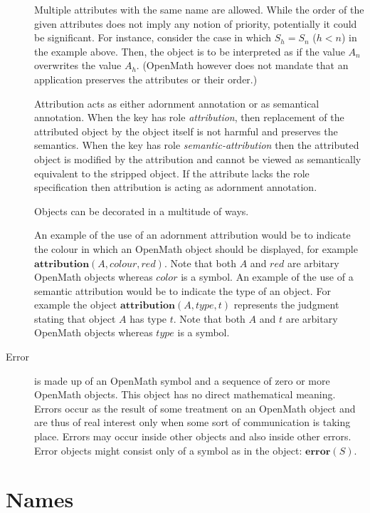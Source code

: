 \documentclass{report}
\def\OM{OpenMath\xspace}
\def\attribution#1{\mathbf{attribution}(#1)}
\def\error#1{\mathbf{error}(#1)}
\begin{document}
\begin{description}
Multiple attributes with the same name are allowed.  While the order of the given
attributes does not imply any notion of priority, potentially it could be significant. For
instance, consider the case in which $S_h=S_n$ ($h<n$) in the example above. Then, the
object is to be interpreted as if the value $A_n$ overwrites the value $A_h$.  (\OM
however does not mandate that an application preserves the attributes or their order.)


Attribution acts as either adornment annotation or as semantical annotation. When the key
has role \emph{attribution}, then replacement of the attributed object by the object
itself is not harmful and preserves the semantics. When the key has role
\emph{semantic-attribution} then the attributed object is modified by the attribution and
cannot be viewed as semantically equivalent to the stripped object. If the attribute lacks
the role specification then attribution is acting as adornment annotation.
  
Objects can be decorated in a multitude of ways.

An example of the use of an adornment attribution would be to indicate the colour in which
an \OM object should be displayed, for example $\attribution{A,colour,red}$.  Note that
both $A$ and $red$ are arbitary \OM objects whereas $color$ is a symbol.  An example of
the use of a semantic attribution would be to indicate the type of an object.  For example
the object $\attribution{A,type,t}$ represents the judgment stating that object $A$ has
type $t$. Note that both $A$ and $t$ are arbitary \OM objects whereas $type$ is a symbol.

\item[Error] is made up of an \OM symbol and a sequence of zero or more \OM objects. This
  object has no direct mathematical meaning.  Errors occur as the result of some treatment
  on an \OM object and are thus of real interest only when some sort of communication is
  taking place. Errors may occur inside other objects and also inside other errors.  Error
  objects might consist only of a symbol as in the object: $\error{S}$.
\end{description} 


\section{Names}\label{sec_names}
\end{document}
